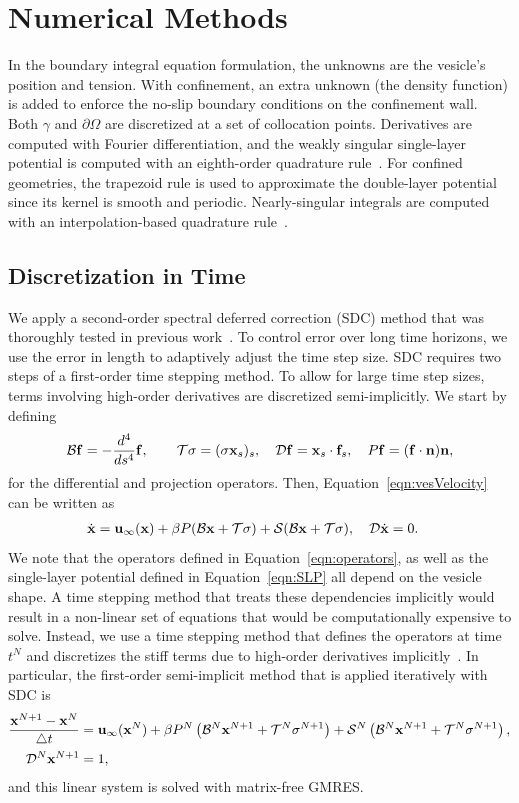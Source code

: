 \documentclass[prb,preprint,showpacs,preprintnumbers,amsmath,amssymb,longbibliography]{revtex4-1}
\begin{document}
\section{Numerical Methods}
\label{sec:numerics}
In the  boundary integral equation formulation, the unknowns are the
vesicle's position and tension. With confinement, an extra unknown (the
density function) is added to enforce the no-slip boundary conditions on
the confinement wall. Both $\gamma$ and $\partial\Omega$ are discretized
at a set of collocation points. Derivatives are computed with Fourier
differentiation, and the weakly singular single-layer potential is
computed with an eighth-order quadrature rule~\cite{alp1999}. For
confined geometries, the trapezoid rule is used to approximate the
double-layer potential since its kernel is smooth and periodic.
Nearly-singular integrals are computed with an interpolation-based
quadrature rule~\cite{qua-bir2014}.

\subsection{Discretization in Time}
We apply a second-order spectral deferred correction (SDC) method that was
thoroughly tested in previous work~\cite{qua-bir2016}. To control error
over long time horizons, we use the error in length to adaptively adjust
the time step size. SDC requires two steps of a first-order time
stepping method. To allow for large time step sizes, terms involving
high-order derivatives are discretized semi-implicitly. We start by
defining
\begin{align}
  \mathcal{B}\mathbf{f} = -\frac{d^4}{ds^4} \mathbf{f},  \qquad
  \mathcal{T}\sigma = (\sigma \mathbf{x}_s)_s, \quad
  \mathcal{D}\mathbf{f} = \mathbf{x}_s \cdot \mathbf{f}_s, \quad
  P\mathbf{f} = (\mathbf{f} \cdot \mathbf{n}) \mathbf{n},
  \label{eqn:operators}
\end{align}
for the differential and projection operators. Then,
Equation~\eqref{eqn:vesVelocity} can be written as
\begin{align}
  \dot{\mathbf{x}} &= \mathbf{u}_\infty(\mathbf{x}) + \beta P(\mathcal{B}\mathbf{x} + \mathcal{T}\sigma)
  + \mathcal{S} (\mathcal{B}\mathbf{x} + \mathcal{T}\sigma), \quad \mathcal{D} \dot{\mathbf{x}} = 0.
\end{align}
We note that the operators defined in Equation~\eqref{eqn:operators}, as
well as the single-layer potential defined in Equation~\eqref{eqn:SLP}
all depend on the vesicle shape. A time stepping method that treats
these dependencies implicitly would result in a non-linear set of
equations that would be computationally expensive to solve. Instead, we
use a time stepping method that defines the operators at time $t^N$ and
discretizes the stiff terms due to high-order derivatives
implicitly~\cite{vee-gue-zor-bir2009, qua-bir2014}. In particular, the
first-order semi-implicit method that is applied iteratively with SDC is
\begin{alignat}{3}  
  \frac{\mathbf{x}^{N+1} - \mathbf{x}^N}{\triangle t} &= \mathbf{u}_\infty(\mathbf{x}^N) 
  + \beta P^N\left(\mathcal{B}^N\mathbf{x}^{N+1} + \mathcal{T}^N\sigma^{N+1}\right) 
  + \mathcal{S}^N\left(\mathcal{B}^N\mathbf{x}^{N+1} + \mathcal{T}^N\sigma^{N+1}\right),  \\
  \mathcal{D}^N\mathbf{x}^{N+1} &= 1,
\end{alignat}
and this linear system is solved with matrix-free GMRES.
\end{document}
